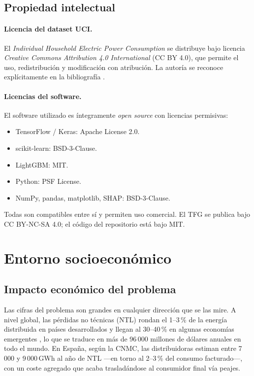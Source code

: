 \subsection{Propiedad intelectual}

\paragraph{Licencia del dataset UCI.} El \emph{Individual Household Electric Power Consumption} se distribuye bajo licencia \emph{Creative Commons Attribution 4.0 International} (CC BY 4.0), que permite el uso, redistribución y modificación con atribución. La autoría se reconoce explícitamente en la bibliografía \cite{hebrail2012uci}.

\paragraph{Licencias del software.} El software utilizado es íntegramente \emph{open source} con licencias permisivas:
\begin{itemize}[leftmargin=*,topsep=0pt]
  \item TensorFlow / Keras: Apache License 2.0.
  \item scikit-learn: BSD-3-Clause.
  \item LightGBM: MIT.
  \item Python: PSF License.
  \item NumPy, pandas, matplotlib, SHAP: BSD-3-Clause.
\end{itemize}
Todas son compatibles entre sí y permiten uso comercial. El TFG se publica bajo CC BY-NC-SA 4.0; el código del repositorio está bajo MIT.

\section{Entorno socioeconómico}
\label{sec:socioeconomico}

\subsection{Impacto económico del problema}

Las cifras del problema son grandes en cualquier dirección que se las mire. A nivel global, las pérdidas no técnicas (NTL) rondan el 1--3\,\% de la energía distribuida en países desarrollados y llegan al 30--40\,\% en algunas economías emergentes \cite{messinis2018review,viegas2017review}, lo que se traduce en más de 96\,000 millones de dólares anuales en todo el mundo. En España, según la CNMC, las distribuidoras estiman entre 7\,000 y 9\,000\,GWh al año de NTL ---en torno al 2--3\,\% del consumo facturado---, con un coste agregado que acaba trasladándose al consumidor final vía peajes.

